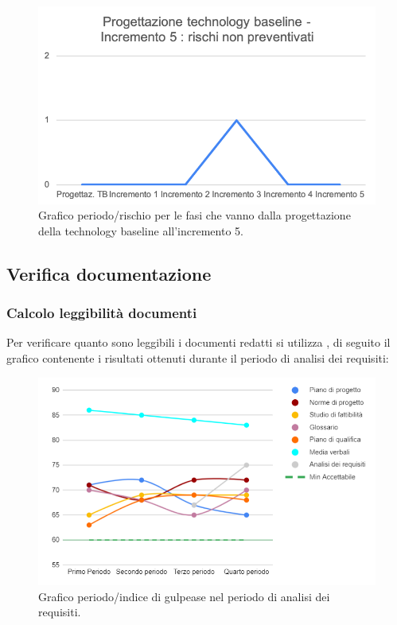 	\begin{figure}[H]
			\centering
			\includegraphics[width=0.8\linewidth]{./res/images/RischiNonPrevent_3.png}
			\caption{Grafico periodo/rischio per le fasi che vanno dalla progettazione della technology baseline all'incremento 5.}
			\label{fig:Grafico periodo/rischio per le fasi che vanno dalla progettazione della technology baseline all'incremento 5.}
	\end{figure}
	

\subsection{Verifica documentazione}

\subsubsection{Calcolo leggibilità documenti}
Per verificare quanto sono leggibili i documenti redatti si utilizza , di seguito il grafico contenente i risultati ottenuti durante il periodo di analisi dei requisiti:

\begin{figure}[H]
	\centering
	\includegraphics[width=0.8\linewidth]{./res/images/gulpease_1.png}
	\caption{Grafico periodo/indice di gulpease nel periodo di analisi dei requisiti.}
	\label{fig:Grafico indice di gulpease periodo di analisi dei requisiti.}
\end{figure}

